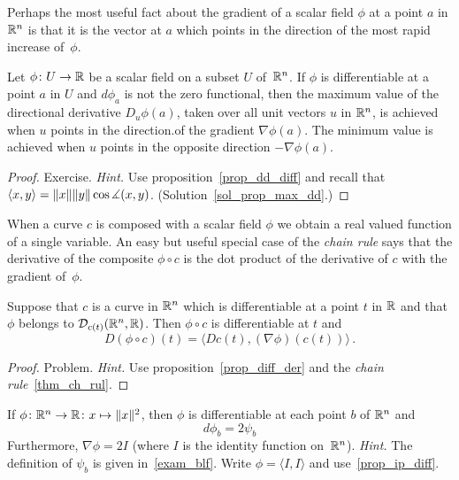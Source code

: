 Perhaps the most useful fact about the gradient of a scalar field $\phi$ at a point $a$ in
$\mathbb{R}^n$ is that it is the vector at $a$ which points in the direction of the most rapid
increase of~$\phi$.

\begin{prop}\label{prop_max_dd}  Let $\phi\colon U \rightarrow \mathbb{R}$ be a scalar field on a subset $U$
of~$\mathbb{R}^n$.  If $\phi$ is differentiable at a point $a$ in $U$ and $d\phi_a$ is not the zero
functional, then the maximum value of the directional derivative $D_u\phi(a)$, taken over all
unit vectors $u$ in $\mathbb{R}^n$, is achieved when $u$ points in the direction.of the gradient
$\nabla\phi(a)$.  The minimum value is achieved when $u$ points in the opposite direction
$-\nabla\phi(a)$.
\end{prop}

\begin{proof} Exercise. \emph{Hint.} Use proposition~\ref{prop_dd_diff} and recall that
$\langle x,y \rangle = \lVert x\rVert \lVert y\rVert \cos\measuredangle(x,y)$.
(Solution~\ref{sol_prop_max_dd}.) \ns
\end{proof}

When a curve $c$ is composed with a scalar field $\phi$ we obtain a real valued function of a
single variable.  An easy but useful special case of the \emph{chain rule} says that the
derivative of the composite $\phi\circ c$ is the dot product of the derivative of $c$ with the
gradient of~$\phi$.

\begin{prop}\label{prop_cr_curv}  Suppose that $c$ is a curve in $\mathbb{R}^n$ which is differentiable
at a point $t$ in $\mathbb{R}$ and that $\phi$ belongs to $\mathcal{D}_{c(t)}(\mathbb{R}^n,\mathbb{R})$.  Then $\phi\circ
c$ is differentiable at $t$ and
  \[ D(\phi \circ c)(t) = \langle Dc(t),(\nabla\phi)(c(t))\rangle\,. \]
\end{prop}

\begin{proof} Problem.  \emph{Hint.}  Use proposition~\ref{prop_diff_der} and the \emph{chain
rule}~\ref{thm_ch_rul}.    \ns
\end{proof}

\begin{prob} If $\phi \colon \mathbb{R}^n \rightarrow \mathbb{R}\colon x \mapsto \lVert x\rVert^2$, then $\phi$ is
differentiable at each point $b$ of $\mathbb{R}^n$ and
  \[ d\phi_b = 2\psi_b \]
Furthermore, $\nabla\phi = 2I$ (where $I$ is the identity function on~$\mathbb{R}^n$).  \emph{Hint.}
The definition of $\psi_b$ is given in~\ref{exam_blf}.  Write $\phi = \langle I,I \rangle$ and
use~\ref{prop_ip_diff}.
\end{prob}


